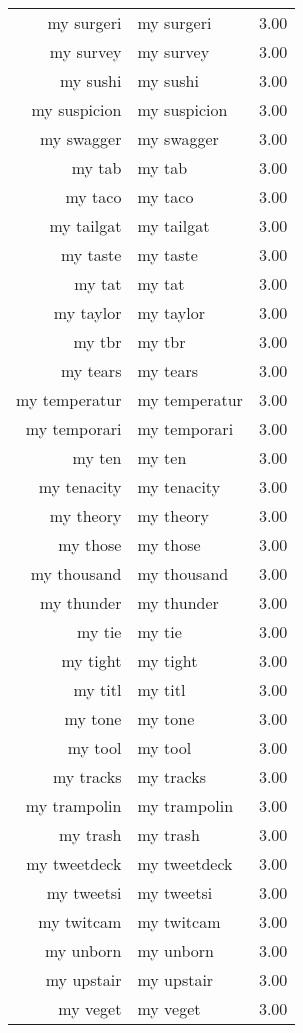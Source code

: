\begin{table}[ht]
\begin{tabular}{rlr}
  my surgeri & my surgeri & 3.00 \\ 
  my survey & my survey & 3.00 \\ 
  my sushi & my sushi & 3.00 \\ 
  my suspicion & my suspicion & 3.00 \\ 
  my swagger & my swagger & 3.00 \\ 
  my tab & my tab & 3.00 \\ 
  my taco & my taco & 3.00 \\ 
  my tailgat & my tailgat & 3.00 \\ 
  my taste & my taste & 3.00 \\ 
  my tat & my tat & 3.00 \\ 
  my taylor & my taylor & 3.00 \\ 
  my tbr & my tbr & 3.00 \\ 
  my tears & my tears & 3.00 \\ 
  my temperatur & my temperatur & 3.00 \\ 
  my temporari & my temporari & 3.00 \\ 
  my ten & my ten & 3.00 \\ 
  my tenacity & my tenacity & 3.00 \\ 
  my theory & my theory & 3.00 \\ 
  my those & my those & 3.00 \\ 
  my thousand & my thousand & 3.00 \\ 
  my thunder & my thunder & 3.00 \\ 
  my tie & my tie & 3.00 \\ 
  my tight & my tight & 3.00 \\ 
  my titl & my titl & 3.00 \\ 
  my tone & my tone & 3.00 \\ 
  my tool & my tool & 3.00 \\ 
  my tracks & my tracks & 3.00 \\ 
  my trampolin & my trampolin & 3.00 \\ 
  my trash & my trash & 3.00 \\ 
  my tweetdeck & my tweetdeck & 3.00 \\ 
  my tweetsi & my tweetsi & 3.00 \\ 
  my twitcam & my twitcam & 3.00 \\ 
  my unborn & my unborn & 3.00 \\ 
  my upstair & my upstair & 3.00 \\ 
  my veget & my veget & 3.00 \\ 

\end{tabular}
\end{table}
